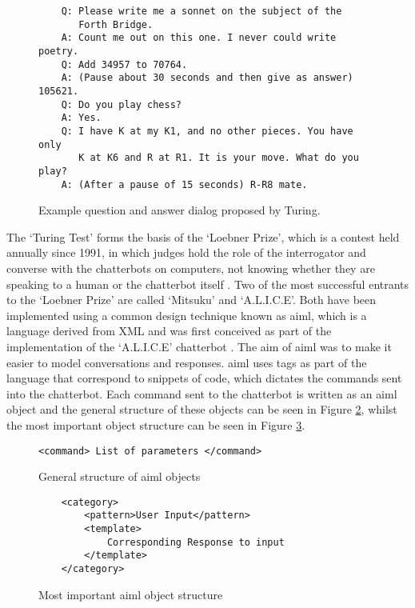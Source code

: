 \begin{figure}[H]
	\centering
	\hspace*{-2cm} 
	\begin{BVerbatim}
	Q: Please write me a sonnet on the subject of the
	   Forth Bridge.
	A: Count me out on this one. I never could write poetry.
	Q: Add 34957 to 70764.
	A: (Pause about 30 seconds and then give as answer) 105621.
	Q: Do you play chess?
	A: Yes.
	Q: I have K at my K1, and no other pieces. You have only
	   K at K6 and R at R1. It is your move. What do you play?
	A: (After a pause of 15 seconds) R-R8 mate.
	\end{BVerbatim}
	
	\caption{Example question and answer dialog proposed by Turing. \autocite{turing-paper1950}}
	\label{fig:exampleQuestionAnswerTuring}
\end{figure}
\noindent
The `Turing Test' forms the basis of the `Loebner Prize', which is a contest held annually since 1991, in which judges hold the role of the interrogator and converse with the chatterbots on computers, not knowing whether they are speaking to a human or the chatterbot itself \autocite{loebner-prize2001}.
Two of the most successful entrants to the `Loebner Prize' are called `Mitsuku' and `A.L.I.C.E'. Both have been implemented using a common design technique known as \gls{aiml}, which is a language derived from XML and was first conceived as part of the implementation of the `A.L.I.C.E' chatterbot \autocite{abdul2015survey}. The aim of \gls{aiml} was to make it easier to model conversations and responses. \gls{aiml} uses tags as part of the language that correspond to snippets of code, which dictates the commands sent into the chatterbot. Each command sent to the chatterbot is written as an \gls{aiml} object and the general structure of these objects can be seen in Figure \ref{fig:general-structure-aiml}, whilst the most important object structure can be seen in Figure \ref{fig:most-important-aiml-object}.\\
\begin{figure}[H]
	\centering
	\texttt{<command> List of parameters </command>}
	
	\caption{General structure of \gls{aiml} objects \autocite{abdul2015survey}}
	\label{fig:general-structure-aiml}
\end{figure}
\begin{figure}[H]
	\centering
	\hspace*{-2cm} 
	\begin{BVerbatim}
	<category>
		<pattern>User Input</pattern>
		<template>
			Corresponding Response to input
		</template>
	</category>
	\end{BVerbatim}
	
	\caption{Most important \gls{aiml} object structure \autocite{abdul2015survey}}
	\label{fig:most-important-aiml-object}
\end{figure}

